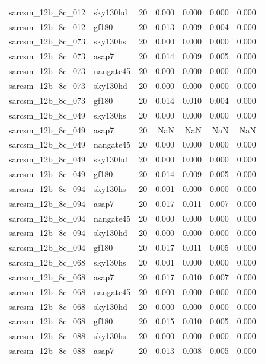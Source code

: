 \begin{tabular}{llrrrrr}
sarcsm\_12b\_8c\_012 & sky130hd & 20 & 0.000 & 0.000 & 0.000 & 0.000 \\
sarcsm\_12b\_8c\_012 & gf180 & 20 & 0.013 & 0.009 & 0.004 & 0.000 \\
sarcsm\_12b\_8c\_073 & sky130hs & 20 & 0.000 & 0.000 & 0.000 & 0.000 \\
sarcsm\_12b\_8c\_073 & asap7 & 20 & 0.014 & 0.009 & 0.005 & 0.000 \\
sarcsm\_12b\_8c\_073 & nangate45 & 20 & 0.000 & 0.000 & 0.000 & 0.000 \\
sarcsm\_12b\_8c\_073 & sky130hd & 20 & 0.000 & 0.000 & 0.000 & 0.000 \\
sarcsm\_12b\_8c\_073 & gf180 & 20 & 0.014 & 0.010 & 0.004 & 0.000 \\
sarcsm\_12b\_8c\_049 & sky130hs & 20 & 0.000 & 0.000 & 0.000 & 0.000 \\
sarcsm\_12b\_8c\_049 & asap7 & 20 & NaN & NaN & NaN & NaN \\
sarcsm\_12b\_8c\_049 & nangate45 & 20 & 0.000 & 0.000 & 0.000 & 0.000 \\
sarcsm\_12b\_8c\_049 & sky130hd & 20 & 0.000 & 0.000 & 0.000 & 0.000 \\
sarcsm\_12b\_8c\_049 & gf180 & 20 & 0.014 & 0.009 & 0.005 & 0.000 \\
sarcsm\_12b\_8c\_094 & sky130hs & 20 & 0.001 & 0.000 & 0.000 & 0.000 \\
sarcsm\_12b\_8c\_094 & asap7 & 20 & 0.017 & 0.011 & 0.007 & 0.000 \\
sarcsm\_12b\_8c\_094 & nangate45 & 20 & 0.000 & 0.000 & 0.000 & 0.000 \\
sarcsm\_12b\_8c\_094 & sky130hd & 20 & 0.000 & 0.000 & 0.000 & 0.000 \\
sarcsm\_12b\_8c\_094 & gf180 & 20 & 0.017 & 0.011 & 0.005 & 0.000 \\
sarcsm\_12b\_8c\_068 & sky130hs & 20 & 0.001 & 0.000 & 0.000 & 0.000 \\
sarcsm\_12b\_8c\_068 & asap7 & 20 & 0.017 & 0.010 & 0.007 & 0.000 \\
sarcsm\_12b\_8c\_068 & nangate45 & 20 & 0.000 & 0.000 & 0.000 & 0.000 \\
sarcsm\_12b\_8c\_068 & sky130hd & 20 & 0.000 & 0.000 & 0.000 & 0.000 \\
sarcsm\_12b\_8c\_068 & gf180 & 20 & 0.015 & 0.010 & 0.005 & 0.000 \\
sarcsm\_12b\_8c\_088 & sky130hs & 20 & 0.000 & 0.000 & 0.000 & 0.000 \\
sarcsm\_12b\_8c\_088 & asap7 & 20 & 0.013 & 0.008 & 0.005 & 0.000 \\

\end{tabular}
